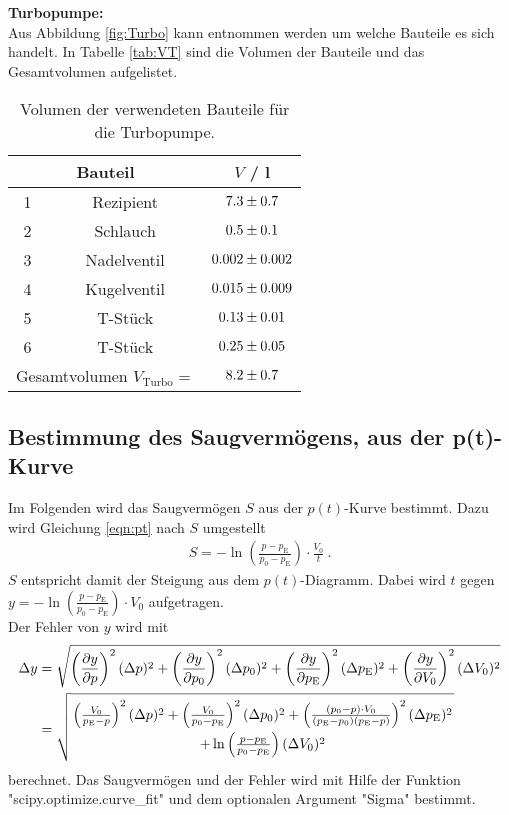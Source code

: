 \textbf{Turbopumpe:} \\
Aus Abbildung \eqref{fig:Turbo} kann entnommen werden um welche Bauteile es sich handelt. In Tabelle \eqref{tab:VT} sind die Volumen der Bauteile und das Gesamtvolumen aufgelistet.

\begin{table}[H] %
  \centering
  \caption{Volumen der verwendeten Bauteile für die Turbopumpe.}
  \label{tab:VT}
  \begin{tabular}{c|c|c}
    \multicolumn{2}{c|}{Bauteil} & $V$ / l \\
    \hline
    1 & Rezipient & $\num{7.3 +- 0.7}$ \\
    2 & Schlauch & $\num{0.5 +- 0.1}$ \\
    3 & Nadelventil & $\num{0.002 +- 0.002}$ \\
    4 & Kugelventil & $\num{0.015 +- 0.009}$ \\
    5 & T-Stück & $\num{0.13 +- 0.01}$ \\
    6 & T-Stück & $\num{0.25 +- 0.05}$ \\
    \hline
    \multicolumn{2}{c}{Gesamtvolumen $V_\text{Turbo} =$} & $\num{8.2 +- 0.7}$ \\
  \end{tabular}
\end{table}



\subsection{Bestimmung des Saugvermögens, aus der p(t)-Kurve}
Im Folgenden wird das Saugvermögen $S$ aus der $p(t)$-Kurve bestimmt. Dazu wird Gleichung \eqref{eqn:pt} nach $S$ umgestellt
\begin{align}
  S = -\ln\left(\frac{p - p_\text{E}}{p_0 - p_\text{E}} \right) \cdot \frac{V_0}{t} \ .
\end{align}
$S$ entspricht damit der Steigung aus dem $p(t)$-Diagramm. Dabei wird $t$ gegen $y = -\ln\left(\frac{p - p_\text{E}}{p_0 - p_\text{E}} \right) \cdot V_0$ aufgetragen. \\
Der Fehler von $y$ wird mit
\begin{align}
  \Delta y &= \sqrt{ \left(\frac{\partial y}{\partial p} \right)^2 (\Delta p)^2 + \left(\frac{\partial y}{\partial p_0} \right)^2 (\Delta p_0)^2 + \left(\frac{\partial y}{\partial p_\text{E}} \right)^2 (\Delta p_\text{E})^2 + \left(\frac{\partial y}{\partial V_0} \right)^2 (\Delta V_0)^2 } \nonumber \\
  &= \sqrt{ \left(\frac{V_0}{p_\text{E}-p} \right)^2 (\Delta p)^2 + \left(\frac{V_0}{p_0-p_\text{E}} \right)^2 (\Delta p_0)^2 + \left(\frac{(p_0-p)\cdot V_0}{(p_\text{E}-p_0)(p_\text{E}-p)} \right)^2 (\Delta p_\text{E})^2 \atop + \ln\left(\frac{p-p_\text{E}}{p_0-p_\text{E}} \right)(\Delta V_0)^2 }
\end{align}
berechnet. Das Saugvermögen und der Fehler wird mit Hilfe der Funktion "scipy.optimize.curve\_fit" \cite{curvefit} und dem optionalen Argument "Sigma" bestimmt.



